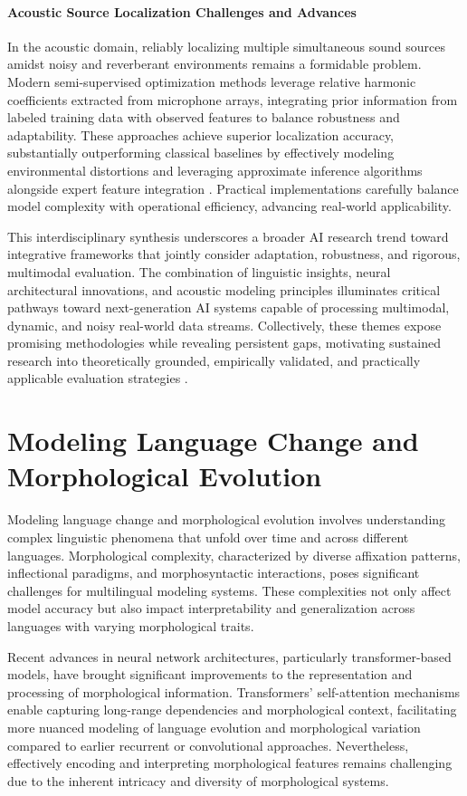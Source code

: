 \documentclass[sigconf]{acmart}
\begin{document}
\paragraph{Acoustic Source Localization Challenges and Advances}  
In the acoustic domain, reliably localizing multiple simultaneous sound sources amidst noisy and reverberant environments remains a formidable problem. Modern semi-supervised optimization methods leverage relative harmonic coefficients extracted from microphone arrays, integrating prior information from labeled training data with observed features to balance robustness and adaptability. These approaches achieve superior localization accuracy, substantially outperforming classical baselines by effectively modeling environmental distortions and leveraging approximate inference algorithms alongside expert feature integration \cite{ref1,ref2,ref3,ref26,ref52}. Practical implementations carefully balance model complexity with operational efficiency, advancing real-world applicability.

This interdisciplinary synthesis underscores a broader AI research trend toward integrative frameworks that jointly consider adaptation, robustness, and rigorous, multimodal evaluation. The combination of linguistic insights, neural architectural innovations, and acoustic modeling principles illuminates critical pathways toward next-generation AI systems capable of processing multimodal, dynamic, and noisy real-world data streams. Collectively, these themes expose promising methodologies while revealing persistent gaps, motivating sustained research into theoretically grounded, empirically validated, and practically applicable evaluation strategies \cite{ref1,ref26}.

\section{Modeling Language Change and Morphological Evolution}

Modeling language change and morphological evolution involves understanding complex linguistic phenomena that unfold over time and across different languages. Morphological complexity, characterized by diverse affixation patterns, inflectional paradigms, and morphosyntactic interactions, poses significant challenges for multilingual modeling systems. These complexities not only affect model accuracy but also impact interpretability and generalization across languages with varying morphological traits.

Recent advances in neural network architectures, particularly transformer-based models, have brought significant improvements to the representation and processing of morphological information. Transformers' self-attention mechanisms enable capturing long-range dependencies and morphological context, facilitating more nuanced modeling of language evolution and morphological variation compared to earlier recurrent or convolutional approaches. Nevertheless, effectively encoding and interpreting morphological features remains challenging due to the inherent intricacy and diversity of morphological systems.
\end{document}
